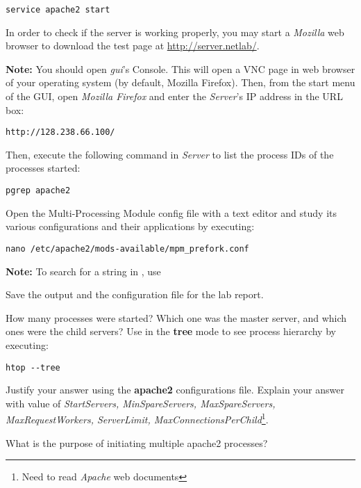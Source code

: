 \documentclass{../UTNetLab}
\begin{document}
\begin{lstlisting}
service apache2 start
\end{lstlisting}

In order to check if the server is working properly, you may start a \textit{Mozilla} web browser to download the test page at \url{http://server.netlab/}.

\textbf{Note: } You should open \textit{gui}'s Console. This will open a VNC page in web browser of your operating system (by default, Mozilla Firefox). Then, from the start menu of the GUI, open \textit{Mozilla Firefox} and enter the \textit{Server}'s IP address in the URL box:

\begin{lstlisting}
http://128.238.66.100/
\end{lstlisting}

Then, execute the following command in \textit{Server} to list the process IDs of the  processes started:

\begin{lstlisting}
pgrep apache2
\end{lstlisting}

Open the Multi-Processing Module config file with a text editor and study its various configurations and their applications by executing:

\begin{lstlisting}
nano /etc/apache2/mods-available/mpm_prefork.conf
\end{lstlisting}

\textbf{Note: } To search for a string in , use 

Save the output and the configuration file for the lab report.

\begin{report}
    \item How many  processes were started?
    Which one was the master server, and which ones were the child servers?
    Use  in the \textbf{tree} mode to see process hierarchy by executing:
    
    \begin{lstlisting}
htop --tree
    \end{lstlisting}

    Justify your answer using the \textbf{apache2} configurations file.
    Explain your answer with value of \textit{StartServers, MinSpareServers, MaxSpareServers, MaxRequestWorkers, ServerLimit, MaxConnectionsPerChild}\footnote{Need to read \textit{Apache} web documents}.

    \item What is the purpose of initiating multiple apache2 processes?
\end{report}
\end{document}

